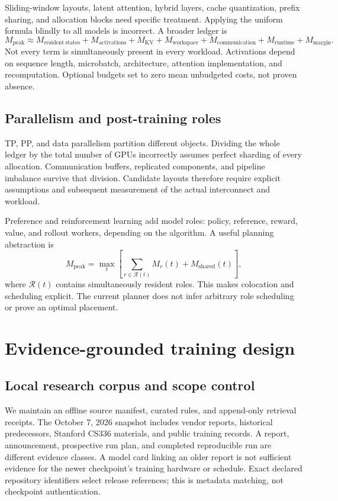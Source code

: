\documentclass[10pt]{article}
\begin{document}
Sliding-window layouts, latent attention, hybrid layers, cache quantization, prefix sharing, and allocation blocks need specific treatment. Applying the uniform formula blindly to all models is incorrect. A broader ledger is
\begin{equation}
M_{\mathrm{peak}}\approx M_{\mathrm{resident\ states}}+M_{\mathrm{activations}}
+M_{\mathrm{KV}}+M_{\mathrm{workspace}}+M_{\mathrm{communication}}
+M_{\mathrm{runtime}}+M_{\mathrm{margin}}.
\end{equation}
Not every term is simultaneously present in every workload. Activations depend on sequence length, microbatch, architecture, attention implementation, and recomputation. Optional budgets set to zero mean unbudgeted costs, not proven absence.

\subsection{Parallelism and post-training roles}
TP, PP, and data parallelism partition different objects. Dividing the whole ledger by the total number of GPUs incorrectly assumes perfect sharding of every allocation. Communication buffers, replicated components, and pipeline imbalance survive that division. Candidate layouts therefore require explicit assumptions and subsequent measurement of the actual interconnect and workload.

Preference and reinforcement learning add model roles: policy, reference, reward, value, and rollout workers, depending on the algorithm. A useful planning abstraction is
\begin{equation}
M_{\mathrm{peak}}=\max_t\left[\sum_{r\in\mathcal R(t)}M_r(t)+M_{\mathrm{shared}}(t)\right],
\end{equation}
where $\mathcal R(t)$ contains simultaneously resident roles. This makes colocation and scheduling explicit. The current planner does not infer arbitrary role scheduling or prove an optimal placement.

\section{Evidence-grounded training design}
\subsection{Local research corpus and scope control}
We maintain an offline source manifest, curated rules, and append-only retrieval receipts. The October 7, 2026 snapshot includes vendor reports, historical predecessors, Stanford CS336 materials, and public training records. A report, announcement, prospective run plan, and completed reproducible run are different evidence classes. A model card linking an older report is not sufficient evidence for the newer checkpoint's training hardware or schedule. Exact declared repository identifiers select release references; this is metadata matching, not checkpoint authentication.
\end{document}
